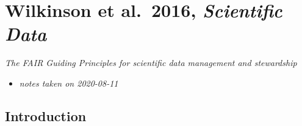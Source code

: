 \documentclass[
]{book}
\providecommand{\tightlist}{%
  \setlength{\itemsep}{0pt}\setlength{\parskip}{0pt}}
\begin{document}
\hypertarget{wilkinson-et-al.-2016-scientific-data}{%
\chapter{\texorpdfstring{Wilkinson et al.~2016, \emph{Scientific Data}}{Wilkinson et al.~2016, Scientific Data}}\label{wilkinson-et-al.-2016-scientific-data}}


\emph{The FAIR Guiding Principles for scientific data management and stewardship} \citep{wilkinson2016fair}

\begin{itemize}
\tightlist
\item
  \emph{notes taken on 2020-08-11}
\end{itemize}

\hypertarget{introduction-11}{%
\section{Introduction}\label{introduction-11}}
\end{document}
